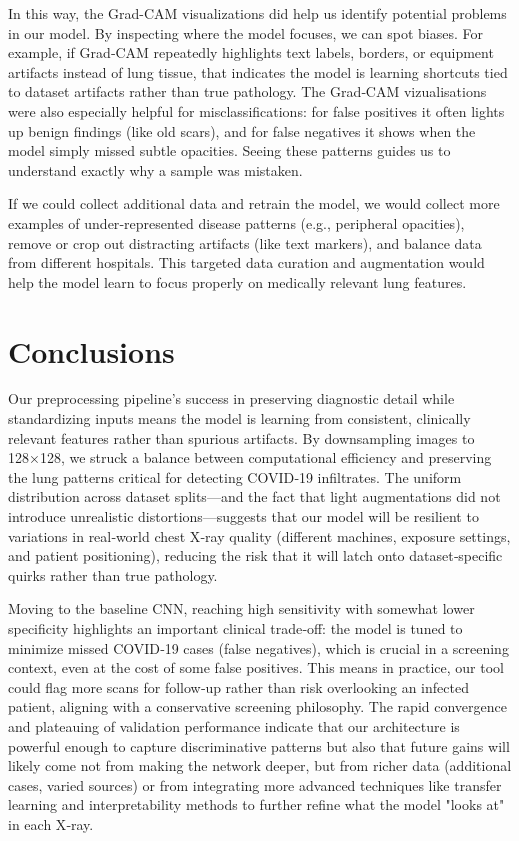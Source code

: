 \documentclass[conference]{IEEEtran}
\begin{document}
In this way, the Grad-CAM visualizations did help us identify potential problems in our model. By inspecting where the model focuses, we can spot biases. For example, if Grad‑CAM repeatedly highlights text labels, borders, or equipment artifacts instead of lung tissue, that indicates the model is learning shortcuts tied to dataset artifacts rather than true pathology. The Grad‑CAM vizualisations were also especially helpful for misclassifications: for false positives it often lights up benign findings (like old scars), and for false negatives it shows when the model simply missed subtle opacities. Seeing these patterns guides us to understand exactly why a sample was mistaken.

If we could collect additional data and retrain the model, we would collect more examples of under‑represented disease patterns (e.g., peripheral opacities), remove or crop out distracting artifacts (like text markers), and balance data from different hospitals. This targeted data curation and augmentation would help the model learn to focus properly on medically relevant lung features.
\section{Conclusions}\label{sec:conclusions}

Our preprocessing pipeline’s success in preserving diagnostic detail while standardizing inputs means the model is learning from consistent, clinically relevant features rather than spurious artifacts. By downsampling images to 128×128, we struck a balance between computational efficiency and preserving the lung patterns critical for detecting COVID‑19 infiltrates. The uniform distribution across dataset splits—and the fact that light augmentations did not introduce unrealistic distortions—suggests that our model will be resilient to variations in real‑world chest X‑ray quality (different machines, exposure settings, and patient positioning), reducing the risk that it will latch onto dataset‐specific quirks rather than true pathology.

Moving to the baseline CNN, reaching high sensitivity with somewhat lower specificity highlights an important clinical trade‑off: the model is tuned to minimize missed COVID‑19 cases (false negatives), which is crucial in a screening context, even at the cost of some false positives. This means in practice, our tool could flag more scans for follow‑up rather than risk overlooking an infected patient, aligning with a conservative screening philosophy. The rapid convergence and plateauing of validation performance indicate that our architecture is powerful enough to capture discriminative patterns but also that future gains will likely come not from making the network deeper, but from richer data (additional cases, varied sources) or from integrating more advanced techniques like transfer learning and interpretability methods to further refine what the model "looks at" in each X‑ray.
\end{document}
